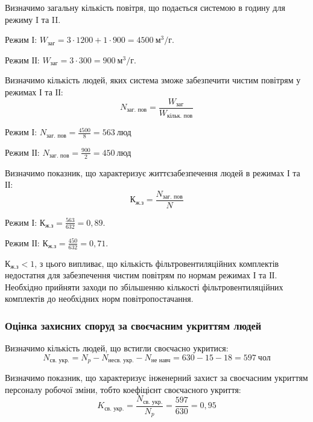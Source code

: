 \documentclass[a4paper,ukrainian,utf8,nocolumnsxix,floatsection,equationsection]{eskdtext}
\renewcommand\paragraph{\subsubsection}
\begin{document}
Визначимо загальну кількість повітря, що подається системою в годину для режиму I та II.

Режим І: $W_\text{заг} = 3 \cdot 1200 + 1 \cdot 900 = 4500 \:\text{м}^3/\text{г}$.

Режим ІІ: $W_\text{заг} = 3 \cdot 300 = 900 \:\text{м}^3/\text{г}$.

Визначимо кількість людей, яких система зможе забезпечити чистим повітрям у режимах І та ІІ:
\begin{equation}
	N_\text{заг. пов} = \frac{W_\text{заг}}{W_\text{кільк. пов}}
\end{equation}

Режим І: $N_\text{заг. пов} = \frac{4500}{8} = 563 \:\text{люд}$

Режим ІІ: $N_\text{заг. пов} = \frac{900}{2} = 450 \:\text{люд}$

Визначимо показник, що характеризує життєзабезпечення людей в режимах І та ІІ:
\begin{equation}
	К_\text{ж.з} = \frac{N_\text{заг. пов}}{N}
\end{equation}

Режим І: $К_\text{ж.з} = \frac{563}{632} = 0,89$.

Режим ІІ: $К_\text{ж.з} = \frac{450}{632} = 0,71$.

$К_\text{ж.з} < 1$, з цього випливає, що кількість фільтровентиляційних комплектів недостатня для забезпечення чистим повітрям по нормам режимах І та ІІ. Необхідно прийняти заходи по збільшенню кількості фільтровентиляційних комплектів до необхідних норм повітропостачання.

\paragraph{Оцінка захисних споруд за своєчасним укриттям людей}

Визначимо кількість людей, що встигли своєчасно укритися:
\begin{equation}
	N_\text{св. укр.} = N_p - N_\text{несв. укр.} - N_\text{не навч} = 630 - 15 - 18 = 597 \:\text{чол}
\end{equation}

Визначимо показник, що характеризує інженерний захист за своєчасним укриттям персоналу робочої зміни, тобто коефіцієнт своєчасного укриття:
\begin{equation}
	K_\text{св. укр.} = \frac{N_\text{св. укр.}}{N_p} = \frac{597}{630} = 0,95
\end{equation}
\end{document}
